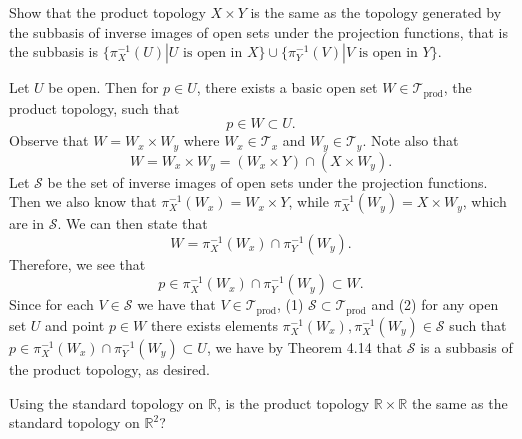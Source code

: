 \documentclass[a4paper,12pt,twoside]{hmcpset}
\begin{document}
\begin{exercise}[Exercise 4.35]
    Show that the product topology $X \times Y$ is
the same as the topology generated by the subbasis of inverse images
of open sets under the projection functions, that is the subbasis is
$\{\pi^{-1}_{X}(U) | U \text{ is open in } X\} \cup \{\pi^{-1}_{Y} (V)
| V \text{ is open in } Y\}.$ 
\end{exercise}

\begin{solution}
Let $U$ be open. Then for $p \in U$, there exists a basic open 
set $W \in \mathscr{T}_\text{prod}$, the product topology, such that 
\[
   p \in W \subset U. 
\]
Observe that $W = W_x \times W_y$ where $W_x \in \mathscr{T}_x$ and $W_y \in
\mathscr{T}_y$. Note also that
\[
   W = W_x \times W_y = (W_x \times Y) \cap (X \times W_y).
\]
Let $\mathscr{S}$ be the set of inverse images of open sets under the
projection functions. Then we also know that $\pi_X^{-1}(W_x) = W_x
\times Y$, while
$\pi_X^{-1}(W_y) = X \times W_y$, which are in $\mathscr{S}$.
We can then state that 
\[
    W = \pi_X^{-1}(W_x) \cap \pi_Y^{-1}(W_y).
\] 
Therefore, we see that 
\[
    p \in \pi_X^{-1}(W_x) \cap \pi_Y^{-1}(W_y) \subset W.  
\]
Since for each $V \in \mathscr{S}$ we have that 
$V \in \mathscr{T}_\text{prod}$, (1) $\mathscr{S} \subset
\mathscr{T}_\text{prod}$ and (2) for any open set $U$ and 
point $p \in W$ there exists elements $\pi_X^{-1}(W_x), \pi_X^{-1}(W_y)
\in \mathscr{S}$ such that 
$p \in \pi_X^{-1}(W_x) \cap \pi_Y^{-1}(W_y) \subset U$, 
we have by Theorem 4.14 that 
$\mathscr{S}$ is a subbasis of the product topology, as desired.
\end{solution}

\begin{exercise}[Exercise 4.36]
    Using the standard topology on $\mathbb{R}$, is
the product topology $\mathbb{R}\times\mathbb{R}$ the same as the
standard topology on $\mathbb{R}^2$?
\end{exercise}
\end{document}
